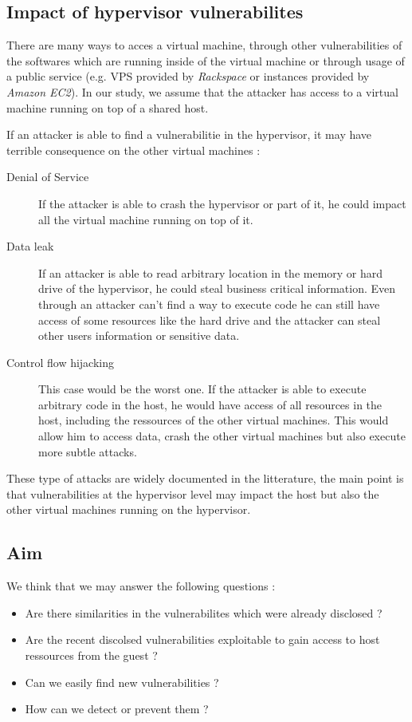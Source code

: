 \subsection{Impact of hypervisor vulnerabilites}
There are many ways to acces a virtual machine, through other vulnerabilities of
the softwares which are running inside of the virtual machine or through
usage of a public service (e.g. VPS provided by \emph{Rackspace} or instances
provided by \emph{Amazon EC2}).
In our study, we assume that the attacker has access to a virtual machine
running on top of a shared host.

If an attacker is able to find a vulnerabilitie in the hypervisor, it may have
terrible consequence on the other virtual machines :
\begin{description}
\item[Denial of Service] If the attacker is able to crash the hypervisor or part
of it, he could impact all the virtual machine running on top of it.
\item[Data leak] If an attacker is able to read arbitrary location in the memory
or hard drive of the hypervisor, he could steal business critical information.
Even through an attacker can't find a way to execute code he can still have
access of some resources like the hard drive and the attacker can steal
other users information or sensitive data.
\item[Control flow hijacking] This case would be the worst one. If the attacker
is able to execute arbitrary code in the host, he would have access of all
resources in the host, including the ressources of the other virtual machines.
This would allow him to access data, crash the other virtual machines but also
execute more subtle attacks.
\end{description}

These type of attacks are widely documented in the litterature, the main point is
that vulnerabilities at the hypervisor level may impact the host but also the other
virtual machines running on the hypervisor.

\subsection{Aim}
We think that we may answer the following questions :
\begin{itemize}
\item Are there similarities in the vulnerabilites which were already disclosed ?
\item Are the recent discolsed vulnerabilities exploitable to gain access to host
ressources from the guest ?
\item Can we easily find new vulnerabilities ?
\item How can we detect or prevent them ?
\end{itemize}

